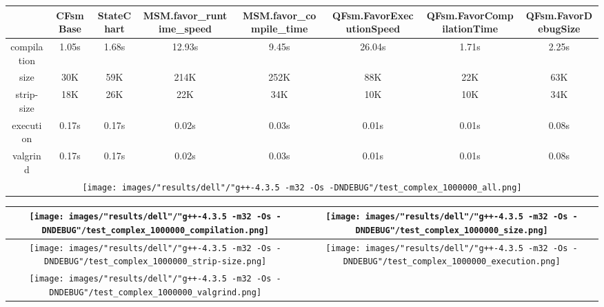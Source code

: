 \begin{landscape}
\begin{table}
\caption{"dell" [df6407d], g++-4.3.5 -m32 -Os -DNDEBUG/test complex 1000000}
\centering
\begin{longtable}{| c | c |c |c |c |c |c |c |}
\hline
& CFsmBase& StateChart& MSM.favor\_runtime\_speed& MSM.favor\_compile\_time& QFsm.FavorExecutionSpeed& QFsm.FavorCompilationTime& QFsm.FavorDebugSize\\
\hline
compilation & 1.05s & 1.68s & 12.93s & 9.45s & 26.04s & 1.71s & 2.25s\\
\hline
size & 30K & 59K & 214K & 252K & 88K & 22K & 63K\\
\hline
strip-size & 18K & 26K & 22K & 34K & 10K & 10K & 34K\\
\hline
execution & 0.17s & 0.17s & 0.02s & 0.03s & 0.01s & 0.01s & 0.08s\\
\hline
valgrind & 0.17s & 0.17s & 0.02s & 0.03s & 0.01s & 0.01s & 0.08s\\
\hline
\multicolumn{8}{|c|}{\texttt{[image: images/"results/dell"/"g++-4.3.5 -m32 -Os -DNDEBUG"/test\_complex\_1000000\_all.png]}}\\
\hline
\end{longtable}
\end{table}
\end{landscape}
\newpage
\begin{table}
\centering
\begin{longtable}{| c | c |}
\hline
\texttt{[image: images/"results/dell"/"g++-4.3.5 -m32 -Os -DNDEBUG"/test\_complex\_1000000\_compilation.png]}& \texttt{[image: images/"results/dell"/"g++-4.3.5 -m32 -Os -DNDEBUG"/test\_complex\_1000000\_size.png]}\\
\hline
\texttt{[image: images/"results/dell"/"g++-4.3.5 -m32 -Os -DNDEBUG"/test\_complex\_1000000\_strip-size.png]}& \texttt{[image: images/"results/dell"/"g++-4.3.5 -m32 -Os -DNDEBUG"/test\_complex\_1000000\_execution.png]}\\
\hline
\texttt{[image: images/"results/dell"/"g++-4.3.5 -m32 -Os -DNDEBUG"/test\_complex\_1000000\_valgrind.png]}& \\ \hline
\end{longtable}
\end{table}

